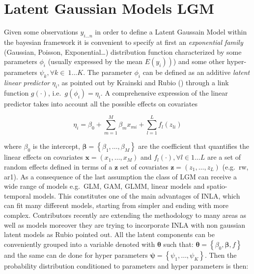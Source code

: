 \documentclass[
  12pt,
  a4paper,
  oneside]{book}
\theoremstyle{definition}
\theoremstyle{definition}
\theoremstyle{definition}
\theoremstyle{remark}
\begin{document}
\hypertarget{LGM}{%
\section{Latent Gaussian Models LGM}\label{LGM}}

Given some observations \(y_{i \ldots n}\) in order to define a Latent Gaussain Model within the bayesian framework it is convenient to specify at first an \emph{exponential family} (Gaussian, Poisson, Exponential\ldots) distribution function characterized by some parameters \(\phi_{i}\) (usually expressed by the mean \(\left.E\left(y_{i}\right)\right)\)) and some other hyper-parameters \(\psi_{k} ,\forall k \in \ 1\ldots K\). The parameter \(\phi_{i}\) can be defined as an additive \emph{latent linear predictor} \(\eta_{i}\), as pointed out by Krainski and Rubio (\citeyearpar{Krainski-Rubio}) through a link function \(g(\cdot)\), i.e.~\(g\left(\phi_{i}\right)=\eta_{i}\). A comprehensive expression of the linear predictor takes into account all the possible effects on covariates

\[
\eta_{i}=\beta_{0}+\sum_{m=1}^{M} \beta_{m} x_{m i}+\sum_{l=1}^{L} f_{l}\left(z_{l i}\right)
\]

where \(\beta_{0}\) is the intercept, \(\boldsymbol{\beta}=\left\{\beta_{1}, \ldots, \beta_{M}\right\}\) are the coefficient that quantifies the linear effects on covariates \(\boldsymbol{x}=\left({x}_{1}, \ldots, {x}_{M}\right)\) and \(f_{l}(\cdot), \forall l \in 1 \ldots L\) are a set of random effects defined in terms of a \(\boldsymbol{z}\) set of covariates \(\boldsymbol{z}=\left(z_{1}, \ldots, z_{L}\right)\) (e.g.~rw, ar1). As a consequence of the last assumption the class of LGM can receive a wide range of models e.g.~GLM, GAM, GLMM, linear models and spatio-temporal models. This constitutes one of the main advantages of INLA, which can fit many different models, starting from simpler and ending with more complex. Contributors recently are extending the methodology to many areas as well as models moreover they are trying to incorporate INLA with non gaussian latent models as Rubio \citeyearpar{Bayesian_INLA_Rubio} pointed out.
All the latent components can be conveniently grouped into a variable denoted with \(\boldsymbol{\theta}\) such that: \(\boldsymbol{\theta}=\left\{\beta_{0}, \boldsymbol{\beta}, f\right\}\) and the same can de done for hyper parameters \(\boldsymbol{\psi} = \left\{\psi_{1}, \ldots, \psi_{K}\right\}\).
Then the probability distribution conditioned to parameters and hyper parameters is then:
\end{document}
